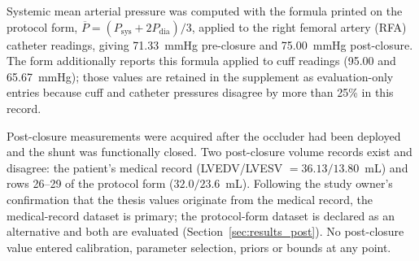 Systemic mean arterial pressure was computed with the formula printed on the protocol form, $\overline{P} = (P_{\mathrm{sys}} + 2P_{\mathrm{dia}})/3$, applied to the right femoral artery (RFA) catheter readings, giving 71.33~mmHg pre-closure and 75.00~mmHg post-closure. The form additionally reports this formula applied to cuff readings (95.00 and 65.67~mmHg); those values are retained in the supplement as evaluation-only entries because cuff and catheter pressures disagree by more than 25\% in this record.

Post-closure measurements were acquired after the occluder had been deployed and the shunt was functionally closed. Two post-closure volume records exist and disagree: the patient's medical record (LVEDV/LVESV $=36.13/13.80$~mL) and rows 26--29 of the protocol form ($32.0/23.6$~mL). Following the study owner's confirmation that the thesis values originate from the medical record, the medical-record dataset is primary; the protocol-form dataset is declared as an alternative and both are evaluated (Section~\ref{sec:results_post}). No post-closure value entered calibration, parameter selection, priors or bounds at any point.

